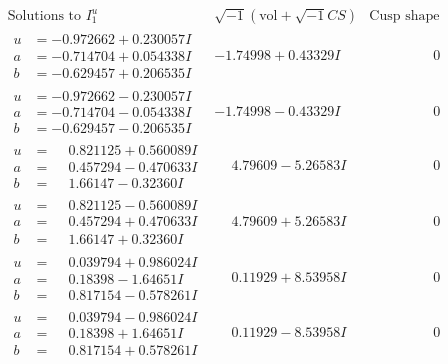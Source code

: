 \documentclass[1p]{elsarticle_modified}
\theoremstyle{definition}
\newcommand{\I}{\sqrt{-1}}
\begin{document}
$$\begin{array}{c|c|c}  
\text{Solutions to }I^u_{1}& \I (\text{vol} + \sqrt{-1}CS) & \text{Cusp shape}\\
 \hline 
\begin{aligned}
u &= -0.972662 + 0.230057 I \\
a &= -0.714704 + 0.054338 I \\
b &= -0.629457 + 0.206535 I\end{aligned}
 & -1.74998 + 0.43329 I & \phantom{-0.000000 } 0 \\ \hline\begin{aligned}
u &= -0.972662 - 0.230057 I \\
a &= -0.714704 - 0.054338 I \\
b &= -0.629457 - 0.206535 I\end{aligned}
 & -1.74998 - 0.43329 I & \phantom{-0.000000 } 0 \\ \hline\begin{aligned}
u &= \phantom{-}0.821125 + 0.560089 I \\
a &= \phantom{-}0.457294 - 0.470633 I \\
b &= \phantom{-}1.66147 - 0.32360 I\end{aligned}
 & \phantom{-}4.79609 - 5.26583 I & \phantom{-0.000000 } 0 \\ \hline\begin{aligned}
u &= \phantom{-}0.821125 - 0.560089 I \\
a &= \phantom{-}0.457294 + 0.470633 I \\
b &= \phantom{-}1.66147 + 0.32360 I\end{aligned}
 & \phantom{-}4.79609 + 5.26583 I & \phantom{-0.000000 } 0 \\ \hline\begin{aligned}
u &= \phantom{-}0.039794 + 0.986024 I \\
a &= \phantom{-}0.18398 - 1.64651 I \\
b &= \phantom{-}0.817154 - 0.578261 I\end{aligned}
 & \phantom{-}0.11929 + 8.53958 I & \phantom{-0.000000 } 0 \\ \hline\begin{aligned}
u &= \phantom{-}0.039794 - 0.986024 I \\
a &= \phantom{-}0.18398 + 1.64651 I \\
b &= \phantom{-}0.817154 + 0.578261 I\end{aligned}
 & \phantom{-}0.11929 - 8.53958 I & \phantom{-0.000000 } 0 \\ \hline\begin{aligned}

\end{aligned}
\end{array}$$
\end{document}
